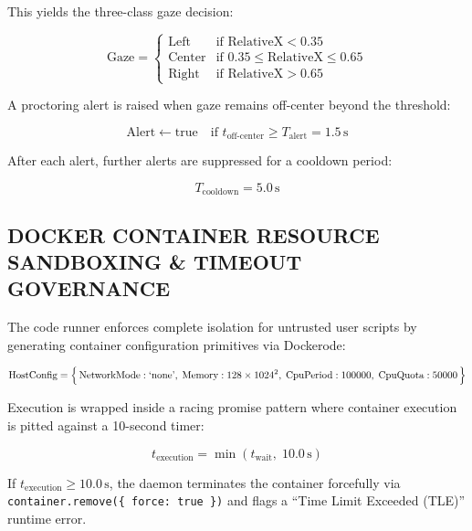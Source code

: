 \documentclass[12pt,a4paper]{report}
\begin{document}
This yields the three-class gaze decision:

\begin{equation}
  \text{Gaze} =
  \begin{cases}
    \text{Left}   & \text{if RelativeX} < 0.35 \\
    \text{Center} & \text{if } 0.35 \le \text{RelativeX} \le 0.65 \\
    \text{Right}  & \text{if RelativeX} > 0.65
  \end{cases}
  \label{eq:gaze-class}
\end{equation}

A proctoring alert is raised when gaze remains off-center beyond the threshold:

\begin{equation}
  \text{Alert} \leftarrow \text{true} \quad
  \text{if } t_{\text{off-center}} \ge T_{\text{alert}} = 1.5\,\text{s}
  \label{eq:alert}
\end{equation}

After each alert, further alerts are suppressed for a cooldown period:

\begin{equation}
  T_{\text{cooldown}} = 5.0\,\text{s}
  \label{eq:cooldown}
\end{equation}

\subsection{DOCKER CONTAINER RESOURCE SANDBOXING \& TIMEOUT GOVERNANCE}

The code runner enforces complete isolation for untrusted user scripts by generating
container configuration primitives via Dockerode:

\begin{equation}
  \text{HostConfig} = \Bigl\{\,
    \text{NetworkMode}: \text{`none'},\;
    \text{Memory}: 128 \times 1024^2,\;
    \text{CpuPeriod}: 100000,\;
    \text{CpuQuota}: 50000
  \,\Bigr\}
  \label{eq:docker-config}
\end{equation}

Execution is wrapped inside a racing promise pattern where container execution is pitted
against a 10-second timer:

\begin{equation}
  t_{\text{execution}} = \min(t_{\text{wait}},\; 10.0\,\text{s})
  \label{eq:exec-timeout}
\end{equation}

If $t_{\text{execution}} \ge 10.0\,\text{s}$, the daemon terminates the container forcefully
via \texttt{container.remove(\{ force: true \})} and flags a ``Time Limit Exceeded (TLE)''
runtime error.
\end{document}
